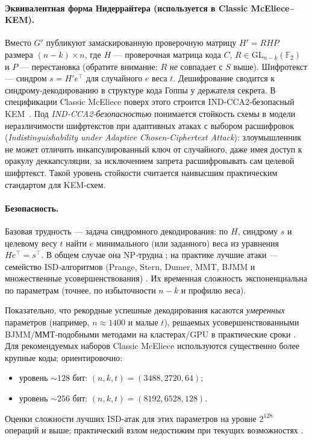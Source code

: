 \paragraph{Эквивалентная форма Нидеррайтера (используется в Classic McEliece–KEM).}
Вместо \(G'\) публикуют замаскированную проверочную матрицу \(H' = RHP\) размера \((n-k)\times n\), где \(H\) — проверочная матрица кода \(C\), \(R\in \mathrm{GL}_{n-k}(\mathbb{F}_2)\) и \(P\) — перестановка (обратите внимание: \(R\) \emph{не} совпадает с \(S\) выше).
Шифротекст — синдром \(s = H' e^{\top}\) для случайного \(e\) веса \(t\).
Дешифрование сводится к синдрому‑декодированию в структуре кода Гоппы у держателя секрета.
В спецификации Classic McEliece поверх этого строится IND-CCA2-безопасный KEM~\cite{ClassicMcEliece2020}.
Под \emph{IND-CCA2-безопасностью} понимается стойкость схемы в модели неразличимости шифртекстов при адаптивных атаках с выбором расшифровок
(\emph{Indistinguishability under Adaptive Chosen-Ciphertext Attack}):
злоумышленник не может отличить инкапсулированный ключ от случайного, даже имея доступ к оракулу деккапсуляции,
за исключением запрета расшифровывать сам целевой шифртекст.
Такой уровень стойкости считается наивысшим практическим стандартом для KEM-схем.

\paragraph{Безопасность.}
Базовая трудность — задача синдромного декодирования: по \(H\), синдрому \(s\) и целевому весу \(t\) найти \(e\) минимального (или заданного) веса из уравнения \(He^{\top}=s^{\top}\). В общем случае она NP‑трудна \cite{BMT1978}; на практике лучшие атаки — семейство ISD‑алгоритмов (Prange, Stern, Dumer, MMT, BJMM и множественные усовершенствования) \cite{Shintaro2024}. Их временная сложность экспоненциальна по параметрам (точнее, по избыточности \(n-k\) и профилю веса).

Показательно, что рекордные успешные декодирования касаются \emph{умеренных} параметров (например, \(n\approx 1400\) и малые \(t\)), решаемых усовершенствованными BJMM/ММТ‑подобными методами на кластерах/GPU в практические сроки \cite{Shintaro2024}. Для рекомендуемых наборов Classic McEliece используются существенно более крупные коды; ориентировочно:
\begin{itemize}
  \item уровень \(\sim\!128\) бит: \((n,k,t)=(3488,2720,64)\);
  \item уровень \(\sim\!256\) бит: \((n,k,t)=(8192,6528,128)\).
\end{itemize}
Оценки сложности лучших ISD‑атак для этих параметров на уровне \(2^{128}\) операций и выше; практический взлом недостижим при текущих возможностях \cite{ClassicMcEliece2020}.




